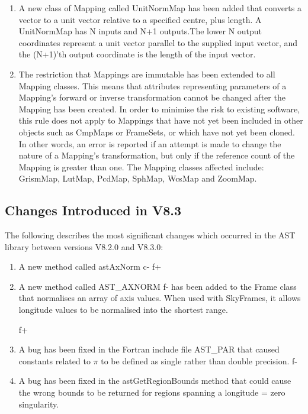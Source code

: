 \documentclass[twoside,11pt]{starlink}
\begin{document}
\begin{enumerate}

\item A new class of Mapping called UnitNormMap has been added that converts
a vector to a unit vector relative to a specified centre, plus length. A
UnitNormMap has N inputs and N+1 outputs.The lower N output coordinates
represent a unit vector parallel to the supplied input vector, and the
(N+1)'th output coordinate is the length of the input vector.

\item The restriction that Mappings are immutable has been extended to all
Mapping classes. This means that attributes representing parameters of
a Mapping's forward or inverse transformation cannot be changed after
the Mapping has been created. In order to minimise the risk to existing
software, this rule does not apply to Mappings that have not yet been
included in other objects such as CmpMaps or FrameSets, or which have not
yet been cloned. In other words, an error is reported if an attempt is
made to change the nature of a Mapping's transformation, but only if the
reference count of the Mapping is greater than one. The Mapping classes
affected include: GrismMap, LutMap, PcdMap, SphMap, WcsMap and ZoomMap.

\end{enumerate}


\subsection{Changes Introduced in V8.3}
The following describes the most significant changes which
occurred in the AST library between versions V8.2.0 and V8.3.0:

\begin{enumerate}

c+
\item A new method called astAxNorm
c-
f+
\item A new method called AST\_AXNORM
f-
has been added to the Frame class that normalises an array of axis
values. When used with SkyFrames, it allows longitude values to be
normalised into the shortest range.

f+
\item A bug has been fixed in the Fortran include file AST\_PAR that caused constants
related to $\pi$ to be defined as single rather than double precision.
f-

\item A bug has been fixed in the astGetRegionBounds method that could
cause the wrong bounds to be returned for regions spanning a longitude =
zero singularity.

\end{enumerate}
\end{document}
